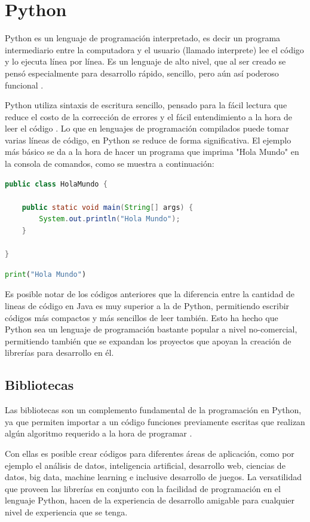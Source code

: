 \section{Python}
Python es un lenguaje de programación interpretado, es decir un programa intermediario entre la computadora y el usuario (llamado interprete) lee el código y lo ejecuta línea por línea. Es un lenguaje de alto nivel, que al ser creado se pensó especialmente para desarrollo rápido, sencillo, pero aún así poderoso funcional \cite{van1995python}.
\par
Python utiliza sintaxis de escritura sencillo, pensado para la fácil lectura que reduce el costo de la corrección de errores y el fácil entendimiento a la hora de leer el código \cite{van1995python}. Lo que en lenguajes de programación compilados puede tomar varias líneas de código, en Python se reduce de forma significativa. El ejemplo más básico se da a la hora de hacer un programa que imprima "Hola Mundo" en la consola de comandos, como se muestra a continuación:

\begin{lstlisting}[language=Java,frame=single,caption=Código del Hola Mundo en Java, inputencoding=latin1]
public class HolaMundo {

	public static void main(String[] args) {		
		System.out.println("Hola Mundo");
	}

}
\end{lstlisting}
\begin{lstlisting}[language=Python,frame=single,caption=Código del Hola Mundo en Python, inputencoding=latin1]
print("Hola Mundo")
\end{lstlisting}

\par
Es posible notar de los códigos anteriores que la diferencia entre la cantidad de lineas de código en Java es muy superior a la de Python, permitiendo escribir códigos más compactos y más sencillos de leer también. Esto ha hecho que Python sea un lenguaje de programación bastante popular a nivel no-comercial, permitiendo también que se expandan los proyectos que apoyan la creación de librerías para desarrollo en él.


\subsection{Bibliotecas}
\par
Las bibliotecas son un complemento fundamental de la programación en Python, ya que permiten importar a un código funciones previamente escritas que realizan algún algoritmo requerido a la hora de programar \cite{van1995python}.
\par
Con ellas es posible crear códigos para diferentes áreas de aplicación, como por ejemplo el análisis de datos, inteligencia artificial, desarrollo web, ciencias de datos, big data, machine learning e inclusive desarrollo de juegos. La versatilidad que proveen las librerías en conjunto con la facilidad de programación en el lenguaje Python, hacen de la experiencia de desarrollo amigable para cualquier nivel de experiencia que se tenga.

